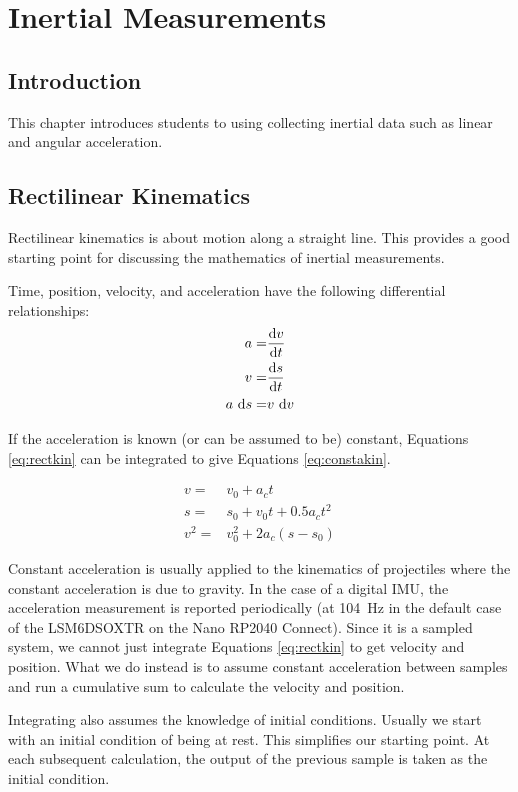 \chapter{Inertial Measurements}

\section{Introduction}
This chapter introduces students to using collecting inertial data such as
linear and angular acceleration.

\section{Rectilinear Kinematics}
Rectilinear kinematics is about motion along a straight line. This provides a good starting point for 
discussing the mathematics of inertial measurements. 

Time, position, velocity, and acceleration have the following differential relationships:
\begin{subequations}
	\label{eq:rectkin}
	\begin{align}
		a = & \dv{v}{t} \\
		v = & \dv{s}{t} \\
		a \ \dd s = & v\  \dd v
	\end{align}
	
\end{subequations}

If the acceleration is known (or can be assumed to be) constant, Equations \ref{eq:rectkin} can be
integrated to give Equations \ref{eq:constakin}.

\begin{subequations}
	\label{eq:constakin}
	\begin{align}
		v = & v_0 + a_ct \\
		s = & s_0 + v_0t + 0.5a_ct^2 \\
		v^2 = & v_0^2 + 2a_c(s - s_0)
	\end{align}
\end{subequations}

Constant acceleration is usually applied to the kinematics of projectiles where the constant acceleration
is due to gravity. In the case of a digital IMU, the acceleration measurement is reported periodically 
(at 104~Hz in the default case of the LSM6DSOXTR on the Nano RP2040 Connect). Since it is a sampled system,
we cannot just integrate Equations \ref{eq:rectkin} to get velocity and position. What we do instead is to
assume constant acceleration between samples and run a cumulative sum to calculate the velocity and position.

Integrating also assumes the knowledge of initial conditions. Usually we start with an initial condition of 
being at rest. This simplifies our starting point. At each subsequent calculation, the output of the previous
sample is taken as the initial condition. 

